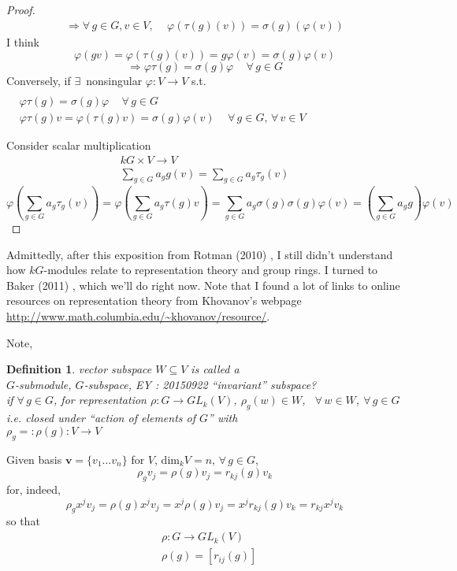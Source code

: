 \documentclass[10pt]{amsart}
\newtheorem{definition}{Definition}
\begin{document}
\begin{multicols*}{2}
\begin{proof}
\[
\begin{gathered}
\Longrightarrow \forall \, g \in G, v\in V, \quad \, \varphi(\tau(g)(v)) = \sigma(g)(\varphi(v))
\end{gathered}
\]
I think 
\[
\varphi(gv) = \varphi(\tau(g)(v)) = g\varphi(v) = \sigma(g)\varphi(v)
\]
\[
\Longrightarrow \varphi \tau(g) = \sigma(g) \varphi \quad \, \forall \, g \in G
\]
Conversely, if $\exists \, $ nonsingular $\varphi : V \to V$ s.t. $\begin{aligned} & \quad \\ 
  & \varphi \tau (g) = \sigma(g) \varphi \quad \, \forall \, g \in G \\
  & \varphi \tau(g) v = \varphi(\tau(g)v) = \sigma(g)\varphi(v) \quad \, \forall \, g \in G, \, \forall \, v \in V \end{aligned}$

Consider scalar multiplication
\[
\begin{gathered}
  kG \times V \to V \\ 
  \sum_{g\in G} a_g g(v) = \sum_{g\in G} a_g \tau_g(v)
\end{gathered}
\]
\[
\varphi \left( \sum_{g\in G} a_g \tau_g(v) \right) = \varphi \left( \sum_{g\in G} a_g \tau(g) v\right) = \sum_{g\in G} a_g \sigma(g) \sigma(g)\varphi(v) = \left( \sum_{g\in G} a_g g \right) \varphi(v)
\]

\end{proof}

Admittedly, after this exposition from Rotman (2010) \cite{JRotman2010}, I still didn't understand how $kG$-modules relate to representation theory and group rings.  I turned to Baker (2011) \cite{ABaker2011}, which we'll do right now.  Note that I found a lot of links to online resources on representation theory from Khovanov's webpage \url{http://www.math.columbia.edu/~khovanov/resource/}.  

Note, 
\begin{definition}
  vector subspace $W \subseteq V$ is called a \\
$G$-submodule, $G$-subspace, EY : 20150922 ``invariant'' subspace? \\
if $\forall \, g \in G$, for representation $\rho : G \to GL_k(V)$, $\rho_g(w) \in W$, \, $\forall \, w \in W$, $\forall \, g \in G$ i.e. closed under ``action of elements of $G$'' with \\
$\rho_g =: \rho (g): V \to V$
\end{definition}
 
Given basis $\mathbf{v} = \lbrace v_1 \dots v_n \rbrace$ for $V$, $\text{dim}_kV = n$, $\forall \, g \in G$, 
\[
\rho_g v_j = \rho(g) v_j = r_{kj}(g) v_k
\]
for, indeed, 
\[
\rho_g x^j v_j = \rho(g) x^j v_j = x^j\rho(g) v_j = x^j r_{kj}(g) v_k = r_{kj} x^j v_k
\]
so that 
\[
\begin{aligned}
& \rho : G \to GL_k(V) \\ 
& \rho(g) = [r_{ij}(g)]
\end{aligned}
\]


\end{multicols*}
\end{document}
